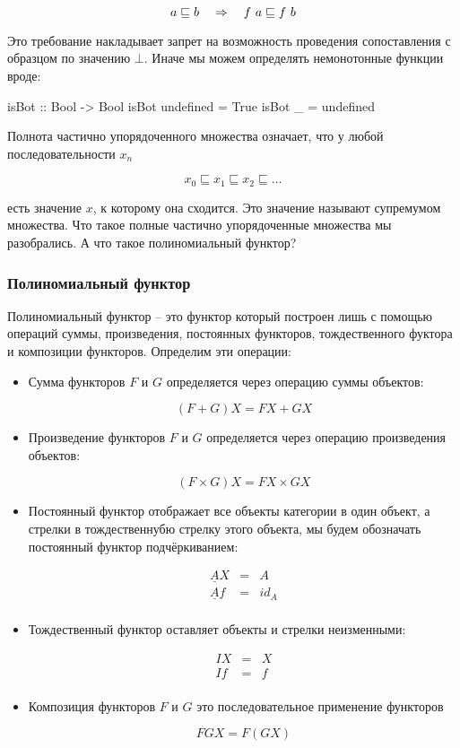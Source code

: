 \[ a \sqsubseteq b \quad \Rightarrow \quad f\ a \sqsubseteq f\ b \]

Это требование накладывает запрет на возможность проведения
сопоставления с образцом по значению $\bot$. Иначе мы можем
определять немонотонные функции вроде:


\begin{code}
isBot :: Bool -> Bool
isBot undefined = True
isBot _         = undefined
\end{code}

Полнота частично упорядоченного множества означает,
что у любой последовательности $x_n$ 

\[ x_0 \sqsubseteq x_1 \sqsubseteq x_2 \sqsubseteq \dots \]

\noindent есть значение $x$, к которому она сходится.
Это значение называют супремумом множества.
Что такое полные частично упорядоченные множества 
мы разобрались. А что такое полиномиальный функтор? 

\subsubsection{Полиномиальный функтор}

Полиномиальный функтор -- это функтор который построен лишь
с помощью операций суммы, произведения, постоянных функторов,
тождественного фуктора и композиции функторов.
Определим эти операции:

\begin{itemize}
\item Сумма функторов $F$ и $G$ определяется через операцию
    суммы объектов:

   \[ (F+G)X = FX + GX \]
        
\item Произведение функторов $F$ и $G$ определяется через операцию 
    произведения объектов:

    \[ (F\times G)X = FX \times GX \]

\item Постоянный функтор отображает все объекты категории 
    в один объект, а стрелки в тождественнубю стрелку этого
    объекта, мы будем обозначать постоянный функтор подчёркиванием:

\begin{eqnarray*}
    \underline{A}X &=& A \\
    \underline{A}f &=& id_A \\
\end{eqnarray*}

\item Тождественный функтор оставляет объекты и стрелки
    неизменными:

\begin{eqnarray*}
    IX &=& X \\
    If &=& f \\
\end{eqnarray*}
  
\item Композиция функторов $F$ и $G$ это последовательное применение 
     функторов

\[ FGX = F(GX) \]
\end{itemize}

